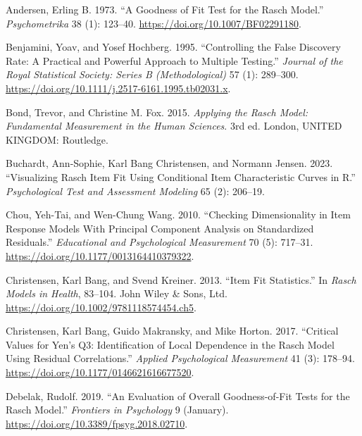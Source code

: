 \documentclass[
  letterpaper,
  DIV=11,
  numbers=noendperiod]{scrartcl}
\newlength{\cslhangindent}
\newenvironment{CSLReferences}[2] %
 {\begin{list}{}{%
  \setlength{\itemindent}{0pt}
  \setlength{\leftmargin}{0pt}
  \setlength{\parsep}{0pt}
  \ifodd #1
   \setlength{\leftmargin}{\cslhangindent}
   \setlength{\itemindent}{-1\cslhangindent}
  \fi
  \setlength{\itemsep}{#2\baselineskip}}}
 {\end{list}}
\begin{document}
\label{refs}
\begin{CSLReferences}{1}{0}
Andersen, Erling B. 1973. {``A Goodness of Fit Test for the Rasch
Model.''} \emph{Psychometrika} 38 (1): 123--40.
\url{https://doi.org/10.1007/BF02291180}.

Benjamini, Yoav, and Yosef Hochberg. 1995. {``Controlling the {False}
{Discovery} {Rate}: {A} {Practical} and {Powerful} {Approach} to
{Multiple} {Testing}.''} \emph{Journal of the Royal Statistical Society:
Series B (Methodological)} 57 (1): 289--300.
\url{https://doi.org/10.1111/j.2517-6161.1995.tb02031.x}.

Bond, Trevor, and Christine M. Fox. 2015. \emph{Applying the {Rasch}
{Model}: {Fundamental} {Measurement} in the {Human} {Sciences}}. 3rd ed.
London, UNITED KINGDOM: Routledge.

Buchardt, Ann-Sophie, Karl Bang Christensen, and Normann Jensen. 2023.
{``Visualizing {Rasch} Item Fit Using Conditional Item Characteristic
Curves in {R}.''} \emph{Psychological Test and Assessment Modeling} 65
(2): 206--19.

Chou, Yeh-Tai, and Wen-Chung Wang. 2010. {``Checking {Dimensionality} in
{Item} {Response} {Models} {With} {Principal} {Component} {Analysis} on
{Standardized} {Residuals}.''} \emph{Educational and Psychological
Measurement} 70 (5): 717--31.
\url{https://doi.org/10.1177/0013164410379322}.

Christensen, Karl Bang, and Svend Kreiner. 2013. {``Item {Fit}
{Statistics}.''} In \emph{Rasch {Models} in {Health}}, 83--104. John
Wiley \& Sons, Ltd. \url{https://doi.org/10.1002/9781118574454.ch5}.

Christensen, Karl Bang, Guido Makransky, and Mike Horton. 2017.
{``Critical {Values} for {Yen}'s {Q3}: {Identification} of {Local}
{Dependence} in the {Rasch} {Model} {Using} {Residual}
{Correlations}.''} \emph{Applied Psychological Measurement} 41 (3):
178--94. \url{https://doi.org/10.1177/0146621616677520}.

Debelak, Rudolf. 2019. {``An {Evaluation} of {Overall}
{Goodness}-of-{Fit} {Tests} for the {Rasch} {Model}.''} \emph{Frontiers
in Psychology} 9 (January).
\url{https://doi.org/10.3389/fpsyg.2018.02710}.


\end{CSLReferences}
\end{document}
